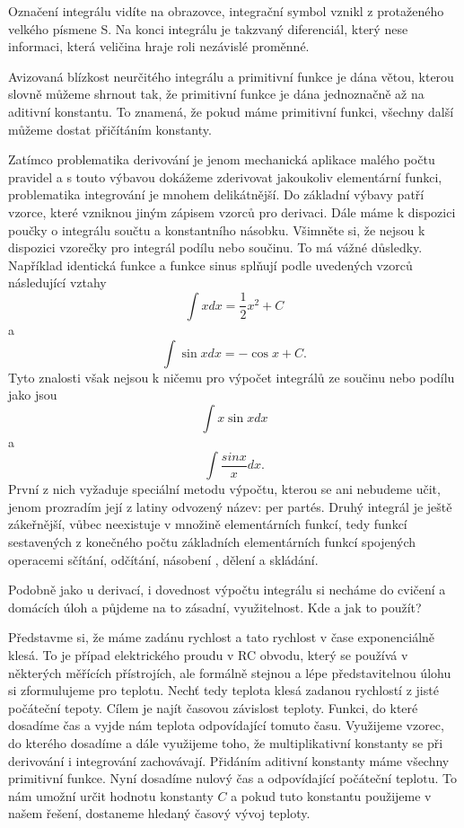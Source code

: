\documentclass[12pt]{article}
\begin{document}
Označení integrálu vidíte na obrazovce, integrační symbol vznikl z protaženého velkého písmene S. Na konci integrálu je takzvaný diferenciál, který nese informaci, která veličina hraje roli nezávislé proměnné.

Avizovaná blízkost neurčitého integrálu a primitivní funkce je dána větou, kterou slovně můžeme shrnout tak, že primitivní funkce je dána jednoznačně až na aditivní konstantu. To znamená, že pokud máme primitivní funkci, všechny další můžeme dostat přičítáním konstanty.

Zatímco problematika derivování je jenom mechanická aplikace malého počtu pravidel a s touto výbavou dokážeme zderivovat jakoukoliv elementární funkci, problematika integrování je mnohem delikátnější. Do základní výbavy patří vzorce, které vzniknou jiným zápisem vzorců pro derivaci. Dále máme k dispozici poučky o integrálu součtu a konstantního násobku. Všimněte si, že nejsou k dispozici vzorečky pro integrál podílu nebo součinu. To má vážné důsledky. Například identická funkce a funkce sinus splňují podle uvedených vzorců následující vztahy
$$\int x dx = \frac 12 x^2+C$$
a
$$\int\sin xdx=-\cos x+C.$$
Tyto znalosti však nejsou k ničemu pro výpočet integrálů ze součinu nebo podílu jako jsou $$\int x\sin xdx$$ a $$\int \frac{sin x}{x}dx.$$ První z nich vyžaduje speciální metodu výpočtu, kterou se ani nebudeme učit, jenom prozradím její z latiny odvozený název: per partés. Druhý integrál je ještě zákeřnější, vůbec neexistuje v množině elementárních funkcí, tedy funkcí sestavených z konečného počtu základních elementárních funkcí spojených operacemi sčítání, odčítání, násobení , dělení a skládání.

Podobně jako u derivací, i dovednost výpočtu integrálu si necháme do cvičení a domácích úloh a půjdeme na to zásadní, využitelnost. Kde a jak to použít?

Představme si, že máme zadánu rychlost a tato rychlost v čase exponenciálně klesá. To je případ elektrického proudu v RC obvodu, který se používá v některých měřících přístrojích, ale formálně stejnou a lépe představitelnou úlohu si zformulujeme pro teplotu. Nechť tedy teplota klesá zadanou rychlostí z jisté počáteční tepoty. Cílem je najít časovou závislost teploty. Funkci, do které dosadíme čas a vyjde nám teplota odpovídající tomuto času. Využijeme vzorec, do kterého dosadíme a dále využijeme toho, že multiplikativní konstanty se při derivování i integrování zachovávají. Přidáním aditivní konstanty máme všechny primitivní funkce. Nyní dosadíme nulový čas a odpovídající počáteční teplotu. To nám umožní určit hodnotu konstanty $C$ a pokud tuto konstantu použijeme v našem řešení, dostaneme hledaný časový vývoj teploty.
\end{document}
